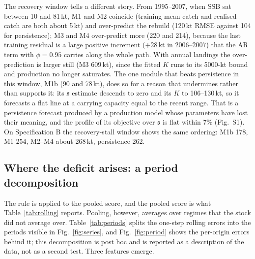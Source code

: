 \documentclass[preprint,11pt,authoryear]{elsarticle}
\theoremstyle{definition}
\theoremstyle{remark}
\newcommand{\kt}{\,\mathrm{kt}}
\newcommand{\sA}{\mathfrak{s}}
\begin{document}
The recovery window tells a different story. From 1995--2007, when SSB sat between 10 and 81\,kt, M1 and M2 coincide (training-mean catch and realised catch are both about 5\,kt) and over-predict the rebuild (120\,kt RMSE against 104 for persistence); M3 and M4 over-predict more (220 and 214), because the last training residual is a large positive increment ($+28\kt$ in 2006--2007) that the AR term with $\phi=0.95$ carries along the whole path. With annual landings the over-prediction is larger still (M3 609\,kt), since the fitted $K$ runs to its 5000-kt bound and production no longer saturates. The one module that beats persistence in this window, M1b (90 and 78\,kt), does so for a reason that undermines rather than supports it: its $\sA$ estimate descends to zero and its $K$ to 106--130\,kt, so it forecasts a flat line at a carrying capacity equal to the recent range. That is a persistence forecast produced by a production model whose parameters have lost their meaning, and the profile of its objective over $\sA$ is flat within 7\% (Fig.~S1). On Specification B the recovery-stall window shows the same ordering: M1b 178, M1 254, M2--M4 about 268\,kt, persistence 262.

\FloatBarrier
\subsection{Where the deficit arises: a period decomposition}\label{sec:periods}

The rule is applied to the pooled score, and the pooled score is what Table~\ref{tab:rolling} reports. Pooling, however, averages over regimes that the stock did not average over. Table~\ref{tab:periods} splits the one-step rolling errors into the periods visible in Fig.~\ref{fig:series}, and Fig.~\ref{fig:period} shows the per-origin errors behind it; this decomposition is post hoc and is reported as a description of the data, not as a second test. Three features emerge.
\end{document}
